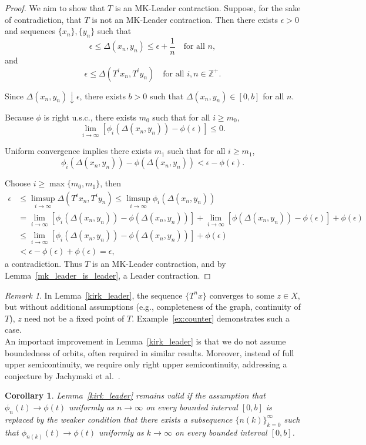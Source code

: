 \documentclass{birkjour}
\newtheorem{cor}[thm]{Corollary}
\theoremstyle{definition}
\theoremstyle{remark}
\newtheorem{rem}[thm]{Remark}
\numberwithin{equation}{section}
\begin{document}
\begin{proof}
We aim to show that \( T \) is an MK-Leader contraction. Suppose, for the sake of contradiction, that \( T \) is not an MK-Leader contraction. Then there exists \(\epsilon > 0\) and sequences \(\{x_n\}, \{y_n\}\) such that
\[
\epsilon \leq \Delta(x_n, y_n) \leq \epsilon + \frac{1}{n} \quad \text{for all } n,
\]
and
\begin{equation}\label{if_not_leader}
\epsilon \leq \Delta(T^i x_n, T^i y_n) \quad \text{for all } i,n\in\mathbb{Z}^{+}.
\end{equation}

Since \(\Delta(x_n,y_n) \downarrow \epsilon\), there exists \(b > 0\) such that \(\Delta(x_n,y_n) \in [0,b]\) for all \(n\).

Because \(\phi\) is right u.s.c., there exists \(m_0\) such that for all \(i \geq m_0\),
\[
\lim_{i \to \infty} [\phi_i(\Delta(x_n,y_n)) - \phi(\epsilon)] \leq 0.
\]

Uniform convergence implies there exists \(m_1\) such that for all \(i \geq m_1\),
\[
\phi_i(\Delta(x_n,y_n)) - \phi(\Delta(x_n,y_n)) < \epsilon - \phi(\epsilon).
\]

Choose \(i \geq \max\{m_0, m_1\}\), then
\begin{align*}
\epsilon &\leq \limsup_{i \to \infty} \Delta(T^i x_n, T^i y_n) \leq \limsup_{i \to \infty} \phi_i(\Delta(x_n,y_n)) \\
&= \lim_{i \to \infty} [\phi_i(\Delta(x_n,y_n)) - \phi(\Delta(x_n,y_n))] + \lim_{i \to \infty} [\phi(\Delta(x_n,y_n)) - \phi(\epsilon)] + \phi(\epsilon) \\
&\leq \lim_{i \to \infty} [\phi_i(\Delta(x_n,y_n)) - \phi(\Delta(x_n,y_n))] + \phi(\epsilon) \\
&< \epsilon - \phi(\epsilon) + \phi(\epsilon) = \epsilon,
\end{align*}
a contradiction. Thus \(T\) is an MK-Leader contraction, and by Lemma~\ref{mk_leader_is_leader}, a Leader contraction.
\end{proof}
\begin{rem}
In Lemma~\ref{kirk_leader}, the sequence \(\{T^n x\}\) converges to some \(z \in X\), but without additional assumptions (e.g., completeness of the graph, continuity of \(T\)), \(z\) need not be a fixed point of \(T\). Example~\ref{ex:counter} demonstrates such a case.\\
An important improvement in Lemma~\ref{kirk_leader} is that we do not assume boundedness of orbits, often required in similar results. Moreover, instead of full upper semicontinuity, we require only right upper semicontinuity, addressing a conjecture by Jachymski et al.~\cite[Remark 4]{jachymski2004}.\\
\end{rem}
\begin{cor}\label{sub_converge}
Lemma~\ref{kirk_leader} remains valid if the assumption that \(\phi_n(t) \to \phi(t)\) uniformly as \(n \to \infty\) on every bounded interval \([0, b]\) is replaced by the weaker condition that there exists a subsequence \(\{n(k)\}_{k=0}^\infty\) such that \(\phi_{n(k)}(t) \to \phi(t)\) uniformly as \(k \to \infty\) on every bounded interval \([0, b]\).
\end{cor}
\end{document}
